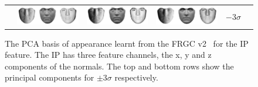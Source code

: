 \begin{figure}
{\begin{tabular}{cccccc}
     & \includegraphics[valign=m,scale=0.16]{statistical_normals/images/lk2d/normals/normals_1_m3} & \includegraphics[valign=m,scale=0.16]{statistical_normals/images/lk2d/normals/normals_2_m3} & \includegraphics[valign=m,scale=0.16]{statistical_normals/images/lk2d/normals/normals_3_m3} & $-3\sigma$
    \end{tabular}%
    }
    \caption{The PCA basis of appearance learnt from the
             FRGC v2~\cite{phillips2005overview} for the IP feature.
             The IP has three feature channels, the x, y and z components of
             the normals.
             The top and bottom rows
             show the principal components for $\pm 3 \sigma$ respectively.}
\label{fig:single_img_2d_aam_appearance_normals}
\end{figure}
\setlength{\tabcolsep}{6pt}
\setlength{\tabcolsep}{2pt}
